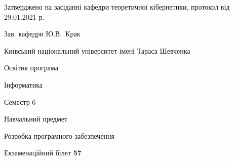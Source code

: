 \documentclass[10pt, ukrainian]{article}
\begin{document}
{\vspace{5mm}\smallskip \begin {small} Затверджено на засіданні кафедри теоретичної кібернетики, протокол  від   29.01.2021 р.\par\smallskip\smallskip
{\parbox {6.5 cm}{Зав. кафедри \dotfill Ю.В.~Крак}} \end{small}}
\newpage

{{\begin {small}\par
{ \center  Київський національний університет імені Тараса Шевченка \par}
{\parbox {5 cm}{Освітня програма \hfill}{\parbox {7 cm}{Інформатика \hfill}}\parbox {6 cm}{\hfill Семестр 6}}\par
{\parbox {5 cm} {Навчальний предмет \hfill}\parbox {7 cm}{Розробка програмного забезпечення \hfill}\parbox {6cm}{\hfill}\par}\vspace{-7pt} \end{small}}{\center Екзаменаційний білет \No \textbf
{ 57 }\par}}
\end{document}
